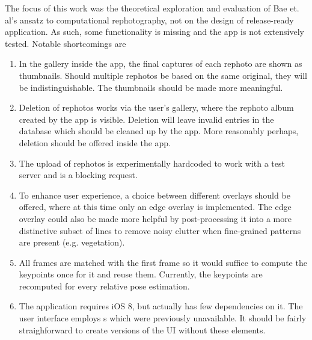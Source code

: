 The focus of this work was the theoretical exploration and evaluation of Bae et.
al's ansatz to computational rephotography, not on the design of release-ready
application. As such, some functionality is missing and the app is not
extensively tested. Notable shortcomings are
\begin{enumerate}
   \item In the gallery inside the app, the final captures of each rephoto are
      shown as thumbnails. Should multiple rephotos be based on the same
      original, they will be indistinguishable. The thumbnails should be made
      more meaningful.

   \item Deletion of rephotos works via the user's gallery, where the rephoto
      album created by the app is visible. Deletion will leave invalid entries
      in the database which should be cleaned up by the app. More reasonably
      perhaps, deletion should be offered inside the app.


   \item The upload of rephotos is experimentally hardcoded to work with a test
      server and is a blocking request.

   \item To enhance user experience, a choice between different overlays should
      be offered, where at this time only an edge overlay is implemented. The
      edge overlay could also be made more helpful by post-processing it into a
      more distinctive subset of lines to remove noisy clutter when fine-grained
      patterns are present (e.g. vegetation).

   \item All frames are matched with the first frame so it would suffice to
      compute the keypoints once for it and reuse them. Currently, the keypoints
      are recomputed for every relative pose estimation.

   \item The application requires iOS 8, but actually has few dependencies on
      it. The user interface employs s which were
      previously unavailable. It should be fairly straighforward to create
      versions of the UI without these elements.


\end{enumerate}
